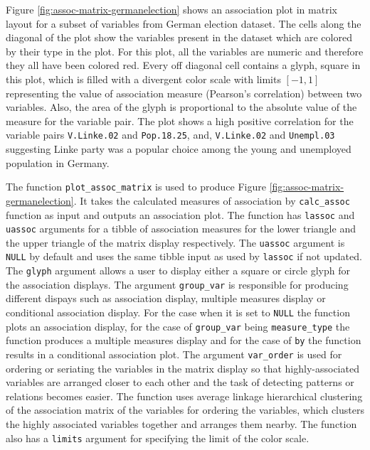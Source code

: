 Figure \ref{fig:assoc-matrix-germanelection} shows an association plot
in matrix layout for a subset of variables from German election dataset.
The cells along the diagonal of the plot show the variables present in
the dataset which are colored by their type in the plot. For this plot,
all the variables are numeric and therefore they all have been colored
red. Every off diagonal cell contains a glyph, square in this plot,
which is filled with a divergent color scale with limits \([-1,1]\)
representing the value of association measure (Pearson's correlation)
between two variables. Also, the area of the glyph is proportional to
the absolute value of the measure for the variable pair. The plot shows
a high positive correlation for the variable pairs \texttt{V.Linke.02}
and \texttt{Pop.18.25}, and, \texttt{V.Linke.02} and \texttt{Unempl.03}
suggesting Linke party was a popular choice among the young and
unemployed population in Germany.

The function \texttt{plot\_assoc\_matrix} is used to produce Figure
\ref{fig:assoc-matrix-germanelection}. It takes the calculated measures
of association by \texttt{calc\_assoc} function as input and outputs an
association plot. The function has \texttt{lassoc} and \texttt{uassoc}
arguments for a tibble of association measures for the lower triangle
and the upper triangle of the matrix display respectively. The
\texttt{uassoc} argument is \texttt{NULL} by default and uses the same
tibble input as used by \texttt{lassoc} if not updated. The
\texttt{glyph} argument allows a user to display either a square or
circle glyph for the association displays. The argument
\texttt{group\_var} is responsible for producing different dispays such
as association display, multiple measures display or conditional
association display. For the case when it is set to \texttt{NULL} the
function plots an association display, for the case of
\texttt{group\_var} being \texttt{measure\_type} the function produces a
multiple measures display and for the case of \texttt{by} the function
results in a conditional association plot. The argument
\texttt{var\_order} is used for ordering or seriating the variables in
the matrix display so that highly-associated variables are arranged
closer to each other and the task of detecting patterns or relations
becomes easier. The function uses average linkage hierarchical
clustering of the association matrix of the variables for ordering the
variables, which clusters the highly associated variables together and
arranges them nearby. The function also has a \texttt{limits} argument
for specifying the limit of the color scale.

